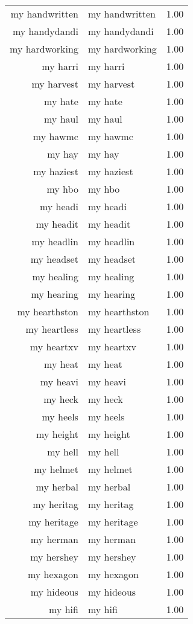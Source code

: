 \begin{table}[ht]
\begin{tabular}{rlr}
  my handwritten & my handwritten & 1.00 \\ 
  my handydandi & my handydandi & 1.00 \\ 
  my hardworking & my hardworking & 1.00 \\ 
  my harri & my harri & 1.00 \\ 
  my harvest & my harvest & 1.00 \\ 
  my hate & my hate & 1.00 \\ 
  my haul & my haul & 1.00 \\ 
  my hawmc & my hawmc & 1.00 \\ 
  my hay & my hay & 1.00 \\ 
  my haziest & my haziest & 1.00 \\ 
  my hbo & my hbo & 1.00 \\ 
  my headi & my headi & 1.00 \\ 
  my headit & my headit & 1.00 \\ 
  my headlin & my headlin & 1.00 \\ 
  my headset & my headset & 1.00 \\ 
  my healing & my healing & 1.00 \\ 
  my hearing & my hearing & 1.00 \\ 
  my hearthston & my hearthston & 1.00 \\ 
  my heartless & my heartless & 1.00 \\ 
  my heartxv & my heartxv & 1.00 \\ 
  my heat & my heat & 1.00 \\ 
  my heavi & my heavi & 1.00 \\ 
  my heck & my heck & 1.00 \\ 
  my heels & my heels & 1.00 \\ 
  my height & my height & 1.00 \\ 
  my hell & my hell & 1.00 \\ 
  my helmet & my helmet & 1.00 \\ 
  my herbal & my herbal & 1.00 \\ 
  my heritag & my heritag & 1.00 \\ 
  my heritage & my heritage & 1.00 \\ 
  my herman & my herman & 1.00 \\ 
  my hershey & my hershey & 1.00 \\ 
  my hexagon & my hexagon & 1.00 \\ 
  my hideous & my hideous & 1.00 \\ 
  my hifi & my hifi & 1.00 \\ 

\end{tabular}
\end{table}
